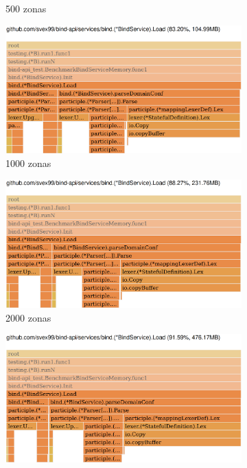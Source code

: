 \begin{figure}
\begin{subfigure}{0.49\textwidth}
        \caption{500 zonas}
    \end{subfigure}
    \hfill
    \begin{subfigure}{0.49\textwidth}
        \includegraphics[width=\textwidth]{Graphics/mem1000z.png}
        \caption{1000 zonas}
    \end{subfigure}
    \hfill
    \begin{subfigure}{0.49\textwidth}
        \includegraphics[width=\textwidth]{Graphics/mem2000z.png}
        \caption{2000 zonas}
    \end{subfigure}
    \hfill
    \begin{subfigure}{0.49\textwidth}
        \includegraphics[width=\textwidth]{Graphics/mem4000z.png}

\end{subfigure}
\end{figure}
